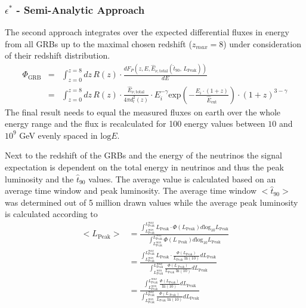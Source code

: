 \subsubsection{$\epsilon^*$ - Semi-Analytic Approach}
The second approach integrates over the expected differential fluxes in energy
from all GRBs up to the maximal chosen redshift ($z_{max}=8$) under
consideration of their redshift distribution.
\begin{eqnarray}
 \Phi_\text{GRB} &=& \int_{z=0}^{z=8} dz \, R(z) \cdot \frac{dF_P \left(z,  E,
\hat{E}_{\nu, \text{total}} \left(\hat{t}_{90}, \, L_\text{Peak}\right)
\right)}{dE} \\
&=& \int_{z=0}^{z=8} dz \, R(z) \cdot \frac{\hat{E}_{\nu, \text{total}}}{4 \pi
d_l^2(z)} \cdot
E_i^{-\gamma}
\text{exp} \left( - \frac{E_i \cdot (1+z)}{\hat{E}_\text{cut}} \right) \cdot
(1+z)^{3 - \gamma}
\end{eqnarray}
The final result needs to equal the measured fluxes on earth over the  whole
energy range and the flux is recalculated for 100 energy values between $10$
and $10^9$ GeV evenly spaced in $\text{log} E$.

Next to the redshift of the GRBs and the energy of the neutrinos the signal
expectation is dependent on the
total energy in neutrinos and thus the peak luminosity and the $\hat{t}_{90}$
values. The average value is calculated based on an average time window and
peak luminosity. The average time window $<\hat{t}_{90}>$ was determined out of
5 million drawn values while the average peak luminosity is calculated
according to
\begin{equation}
\begin{align}
 <L_\text{Peak}> &=
\frac{\int_{L_\text{Peak}^{min}}^{L_\text{Peak}^{max}} L_\text{Peak}
\cdot \Phi(L_\text{Peak})
d\text{log}_{10}L_\text{Peak}}{\int_{L_\text{Peak}^{min}}^{L_\text{Peak}^{max}
}\Phi(L_\text{ Peak})
d\text{log}_{10}L_\text{Peak}}\\
&= \frac{\int_{L_\text{Peak}^{min}}^{L_\text{Peak}^{max}} L_\text{Peak}
\cdot
\frac{\Phi(L_\text{Peak})}{L_\text{Peak} \text{ ln}(10)}
dL_\text{Peak}}{\int_{L_\text{Peak}^{min}}^{L_\text{Peak}^{max}}\frac{
\Phi(L_\text{ Peak})}{L_\text{Peak}
\text{ ln}(10)} dL_\text{Peak}}\\
&=
\frac{\int_{L_\text{Peak}^{min}}^{L_\text{Peak}^{max}}\frac{\Phi(L_\text{
Peak})}{\text{ln} (10)}
dL_\text{Peak}}{\int_{L_\text{Peak}^{min}}^{L_\text{Peak}^{max}}\frac{
\Phi(L_\text{ Peak})}{L_\text{Peak}
\text{ ln}(10)} dL_\text{Peak}}
\end{align}
\end{equation}

